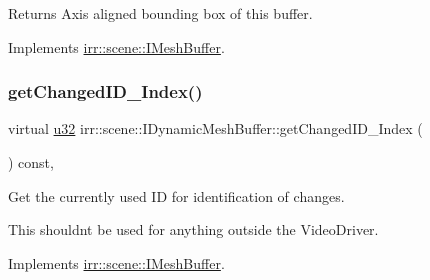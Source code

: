 \begin{DoxyReturn}{Returns}
Axis aligned bounding box of this buffer. 
\end{DoxyReturn}


Implements \hyperlink{classirr_1_1scene_1_1IMeshBuffer_ac53fe1096756a40f25dae25911e27c51}{irr\+::scene\+::\+I\+Mesh\+Buffer}.

\mbox{\label{classirr_1_1scene_1_1IDynamicMeshBuffer_a2514a3d0e4865b7b9714fe1f9f58ad51}} 
\subsubsection{\texorpdfstring{get\+Changed\+I\+D\+\_\+\+Index()}{getChangedID\_Index()}\hspace{0.1cm}{\footnotesize\ttfamily [1/2]}}
{\footnotesize\ttfamily virtual \hyperlink{namespaceirr_a0416a53257075833e7002efd0a18e804}{u32} irr\+::scene\+::\+I\+Dynamic\+Mesh\+Buffer\+::get\+Changed\+I\+D\+\_\+\+Index (\begin{DoxyParamCaption}{ }\end{DoxyParamCaption}) const\hspace{0.3cm}{\ttfamily [inline]}, {\ttfamily [virtual]}}



Get the currently used ID for identification of changes. 

This shouldn\textquotesingle{}t be used for anything outside the Video\+Driver. 

Implements \hyperlink{classirr_1_1scene_1_1IMeshBuffer_acc389d76856dfb06c3ba45a92315e6d8}{irr\+::scene\+::\+I\+Mesh\+Buffer}.

\mbox{\label{classirr_1_1scene_1_1IDynamicMeshBuffer_a2514a3d0e4865b7b9714fe1f9f58ad51}} 
